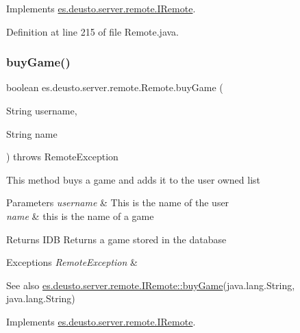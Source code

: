 Implements \hyperlink{interfacees_1_1deusto_1_1server_1_1remote_1_1_i_remote_a991909db4d26d5be67bb3e0bcb501c7e}{es.\+deusto.\+server.\+remote.\+I\+Remote}.



Definition at line 215 of file Remote.\+java.

\mbox{\label{classes_1_1deusto_1_1server_1_1remote_1_1_remote_ad9f8ad426b1162504b7b39eb1c86d2a3}} 
\subsubsection{\texorpdfstring{buy\+Game()}{buyGame()}}
{\footnotesize\ttfamily boolean es.\+deusto.\+server.\+remote.\+Remote.\+buy\+Game (\begin{DoxyParamCaption}\item[{String}]{username,  }\item[{String}]{name }\end{DoxyParamCaption}) throws Remote\+Exception}

This method buys a game and adds it to the user owned list 
\begin{DoxyParams}{Parameters}
{\em username} & This is the name of the user \\
\hline
{\em name} & this is the name of a game \\
\hline
\end{DoxyParams}
\begin{DoxyReturn}{Returns}
I\+DB Returns a game stored in the database 
\end{DoxyReturn}

\begin{DoxyExceptions}{Exceptions}
{\em Remote\+Exception} & \\
\hline
\end{DoxyExceptions}
\begin{DoxySeeAlso}{See also}
\hyperlink{interfacees_1_1deusto_1_1server_1_1remote_1_1_i_remote_ad2e6ee616bdc780b4057e63bf2ae8be7}{es.\+deusto.\+server.\+remote.\+I\+Remote\+::buy\+Game}(java.\+lang.\+String, java.\+lang.\+String) 
\end{DoxySeeAlso}


Implements \hyperlink{interfacees_1_1deusto_1_1server_1_1remote_1_1_i_remote_ad2e6ee616bdc780b4057e63bf2ae8be7}{es.\+deusto.\+server.\+remote.\+I\+Remote}.



